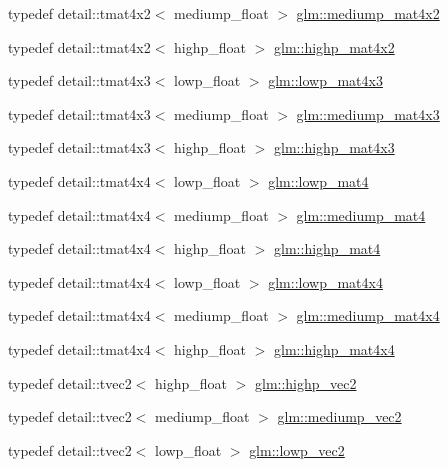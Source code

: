 \begin{DoxyCompactItemize}
\item 
typedef detail\+::tmat4x2$<$ mediump\+\_\+float $>$ \hyperlink{group__core__precision_gad8c4b5a61db5087e32506b2022442edd}{glm\+::mediump\+\_\+mat4x2}
\item 
typedef detail\+::tmat4x2$<$ highp\+\_\+float $>$ \hyperlink{group__core__precision_gaea696a76cb6e8c9b85ee9f0fd2e38a05}{glm\+::highp\+\_\+mat4x2}
\item 
typedef detail\+::tmat4x3$<$ lowp\+\_\+float $>$ \hyperlink{group__core__precision_ga072d9727aa59df856b83cfc01cb131bf}{glm\+::lowp\+\_\+mat4x3}
\item 
typedef detail\+::tmat4x3$<$ mediump\+\_\+float $>$ \hyperlink{group__core__precision_ga2c1b39d629d83063a0d59cf14b4f52a3}{glm\+::mediump\+\_\+mat4x3}
\item 
typedef detail\+::tmat4x3$<$ highp\+\_\+float $>$ \hyperlink{group__core__precision_ga940a4f42a51d8dee13869ca90aa24df6}{glm\+::highp\+\_\+mat4x3}
\item 
typedef detail\+::tmat4x4$<$ lowp\+\_\+float $>$ \hyperlink{group__core__precision_ga39e75439a03361f4407feab2e2eb5f93}{glm\+::lowp\+\_\+mat4}
\item 
typedef detail\+::tmat4x4$<$ mediump\+\_\+float $>$ \hyperlink{group__core__precision_gabd9b3a319a914cd49dab821d4dbc93d4}{glm\+::mediump\+\_\+mat4}
\item 
typedef detail\+::tmat4x4$<$ highp\+\_\+float $>$ \hyperlink{group__core__precision_gacab0d5de2ce45d2d2e08e4563a15377f}{glm\+::highp\+\_\+mat4}
\item 
typedef detail\+::tmat4x4$<$ lowp\+\_\+float $>$ \hyperlink{group__core__precision_gad3ab398e7b5115c5dcdbd497dea08664}{glm\+::lowp\+\_\+mat4x4}
\item 
typedef detail\+::tmat4x4$<$ mediump\+\_\+float $>$ \hyperlink{group__core__precision_ga6023cdb8df00d662cb6c1bce2632381a}{glm\+::mediump\+\_\+mat4x4}
\item 
typedef detail\+::tmat4x4$<$ highp\+\_\+float $>$ \hyperlink{group__core__precision_gaa277c02de6192621d520335f0d2e4930}{glm\+::highp\+\_\+mat4x4}
\item 
typedef detail\+::tvec2$<$ highp\+\_\+float $>$ \hyperlink{group__core__precision_ga0747567a49e0fa00ecd05011c1645d69}{glm\+::highp\+\_\+vec2}
\item 
typedef detail\+::tvec2$<$ mediump\+\_\+float $>$ \hyperlink{group__core__precision_gaa19e624188c7908ba28b9ef829e076f2}{glm\+::mediump\+\_\+vec2}
\item 
typedef detail\+::tvec2$<$ lowp\+\_\+float $>$ \hyperlink{group__core__precision_ga158d9bb292b42c86b36e8eaff3b22394}{glm\+::lowp\+\_\+vec2}

\end{DoxyCompactItemize}

